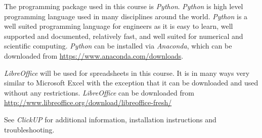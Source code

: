         The programming package used in this course is \textit{Python}.
        \textit{Python} is high level programming language used in many
        disciplines around the world. \textit{Python} is a well suited
        programming language for engineers as it is easy to learn, well
        supported and documented, relatively fast, and well suited for
        numerical and scientific computing. \textit{Python} can be installed
        via \textit{Anaconda}, which can be downloaded from
        \url{https://www.anaconda.com/downloads}.

        \textit{LibreOffice} will be used for spreadsheets in this course. It
        is in many ways very similar to Microsoft Excel with the exception that
        it can be downloaded and used without any restrictions.
        \textit{LibreOffice} can be downloaded from
        \url{http://www.libreoffice.org/download/libreoffice-fresh/}

        See \textit{ClickUP} for additional information, installation
        instructions and troubleshooting.
